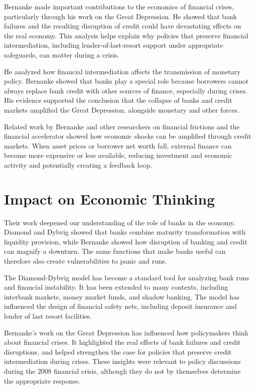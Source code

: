 Bernanke made important contributions to the economics of financial crises, particularly through
his work on the Great Depression. He showed that bank failures and the resulting disruption of
credit could have devastating effects on the real economy. This analysis helps explain why
policies that preserve financial intermediation, including lender-of-last-resort support under
appropriate safeguards, can matter during a crisis.

He analyzed how financial intermediation affects the transmission of monetary policy. Bernanke
showed that banks play a special role because borrowers cannot always replace bank credit with
other sources of finance, especially during crises. His evidence supported the conclusion that
the collapse of banks and credit markets amplified the Great Depression, alongside monetary and
other forces.

Related work by Bernanke and other researchers on financial frictions and the financial
accelerator showed how economic shocks can be amplified through credit markets. When asset
prices or borrower net worth fall, external finance can become more expensive or less available,
reducing investment and economic activity and potentially creating a feedback loop.

\section{Impact on Economic Thinking}
Their work deepened our understanding of the role of banks in the economy. Diamond and Dybvig
showed that banks combine maturity transformation with liquidity provision, while Bernanke
showed how disruption of banking and credit can magnify a downturn. The same functions that make
banks useful can therefore also create vulnerabilities to panic and runs.

The Diamond-Dybvig model has become a standard tool for analyzing bank runs and financial
instability. It has been extended to many contexts, including interbank markets, money market
funds, and shadow banking. The model has influenced the design of financial safety nets,
including deposit insurance and lender of last resort facilities.

Bernanke's work on the Great Depression has influenced how policymakers think about financial
crises. It highlighted the real effects of bank failures and credit disruptions, and helped
strengthen the case for policies that preserve credit intermediation during crises. These
insights were relevant to policy discussions during the 2008 financial crisis, although they do
not by themselves determine the appropriate response.

